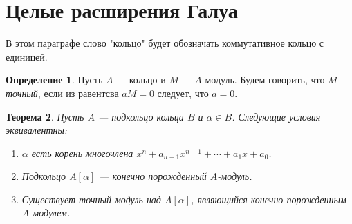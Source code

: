 \documentclass[12pt, titlepage, oneside]{amsbook}
\newtheorem{theorem}{Теорема}[chapter]
\theoremstyle{definition}
\newtheorem{definition}[theorem]{Определение}
\theoremstyle{remark}
\begin{document}
\section{Целые расширения Галуа}

В этом параграфе слово "кольцо" будет обозначать коммутативное кольцо с единицей.

\begin{definition}
Пусть $A$ --- кольцо и $M$ --- $A$-модуль. Будем говорить, что $M$ \emph{точный}, если из равентсва $aM=0$ следует, что $a=0$.
\end{definition}


\begin{theorem}
\label{Zel1}
Пусть $A$ --- подкольцо кольца $B$ и $\alpha\in B$. Следующие условия эквивалентны:
\begin{enumerate}
\item $\alpha$ есть корень многочлена $x^n+a_{n-1}x^{n-1}+\cdots+a_1x+a_0$.
\item Подкольцо $A[\alpha]$ --- конечно порожденный $A$-модуль.
\item Существует точный модуль над $A[\alpha]$, являющийся конечно порожденным $A$-модулем.
\end{enumerate}
\end{theorem}
\end{document}
